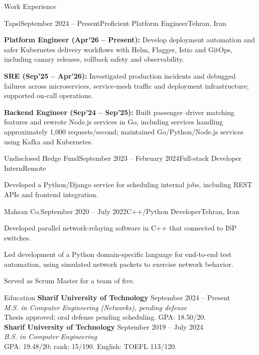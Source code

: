 \documentclass[11pt]{resume}
\begin{document}
\begin{rSection}{Work Experience}
\begin{rSubsection}{Tapsi}{September 2024 -- Present}{Proficient Platform Engineer}{Tehran, Iran}
\item \textbf{Platform Engineer (Apr'26 -- Present):} Develop deployment automation and safer Kubernetes delivery workflows with Helm, Flagger, Istio and GitOps, including canary releases, rollback safety and observability.
\item \textbf{SRE (Sep'25 -- Apr'26):} Investigated production incidents and debugged failures across microservices, service-mesh traffic and deployment infrastructure; supported on-call operations.
\item \textbf{Backend Engineer (Sep'24 -- Sep'25):} Built passenger--driver matching features and rewrote Node.js services in Go, including services handling approximately 1,000 requests/second; maintained Go/Python/Node.js services using Kafka and Kubernetes.
\end{rSubsection}
\begin{rSubsection}{Undisclosed Hedge Fund}{September 2023 -- February 2024}{Full-stack Developer Intern}{Remote}
\item Developed a Python/Django service for scheduling internal jobs, including REST APIs and frontend integration.
\end{rSubsection}
\begin{rSubsection}{Mahsan Co.}{September 2020 -- July 2022}{C++/Python Developer}{Tehran, Iran}
\item Developed parallel network-relaying software in C++ that connected to ISP switches.
\item Led development of a Python domain-specific language for end-to-end test automation, using simulated network packets to exercise network behavior.
\item Served as Scrum Master for a team of five.
\end{rSubsection}
\end{rSection}

\begin{rSection}{Education}
\textbf{Sharif University of Technology} \hfill September 2024 -- Present\\
\textit{M.S. in Computer Engineering (Networks), pending defense}\\
Thesis approved; oral defense pending scheduling. GPA: 18.50/20.\\[5pt]
\textbf{Sharif University of Technology} \hfill September 2019 -- July 2024\\
\textit{B.S. in Computer Engineering}\\
GPA: 19.48/20; rank: 15/190. English: TOEFL 113/120.
\end{rSection}
\end{document}
